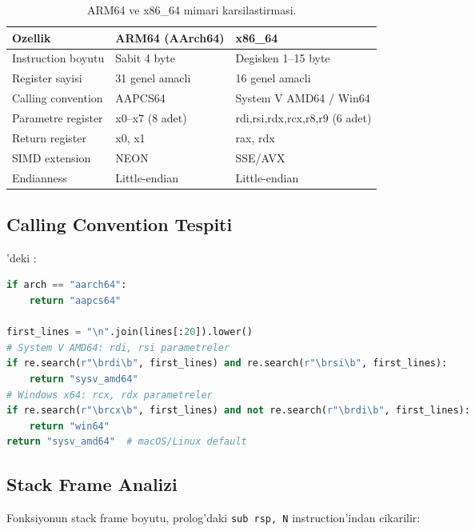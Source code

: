 \begin{table}[htbp]
\centering
\begin{tabular}{lll}
\toprule
\textbf{\color{sectioncyan}Ozellik} & \textbf{\color{sectioncyan}ARM64 (AArch64)} & \textbf{\color{sectioncyan}x86\_64} \\
\midrule
Instruction boyutu  & Sabit 4 byte         & Degisken 1--15 byte \\
Register sayisi     & 31 genel amacli      & 16 genel amacli \\
Calling convention  & AAPCS64              & System V AMD64 / Win64 \\
Parametre register  & x0--x7 (8 adet)      & rdi,rsi,rdx,rcx,r8,r9 (6 adet) \\
Return register     & x0, x1               & rax, rdx \\
SIMD extension      & NEON                 & SSE/AVX \\
Endianness          & Little-endian        & Little-endian \\
\bottomrule
\end{tabular}
\caption{ARM64 ve x86\_64 mimari karsilastirmasi.}
\label{tab:arm-vs-x86}
\end{table}

\subsection{Calling Convention Tespiti}

'deki :

\begin{lstlisting}[language=Python, caption={Calling convention tespiti}]
if arch == "aarch64":
    return "aapcs64"

first_lines = "\n".join(lines[:20]).lower()
# System V AMD64: rdi, rsi parametreler
if re.search(r"\brdi\b", first_lines) and re.search(r"\brsi\b", first_lines):
    return "sysv_amd64"
# Windows x64: rcx, rdx parametreler
if re.search(r"\brcx\b", first_lines) and not re.search(r"\brdi\b", first_lines):
    return "win64"
return "sysv_amd64"  # macOS/Linux default
\end{lstlisting}

\subsection{Stack Frame Analizi}

Fonksiyonun stack frame boyutu, prolog'daki \texttt{sub rsp, N} instruction'indan cikarilir:

